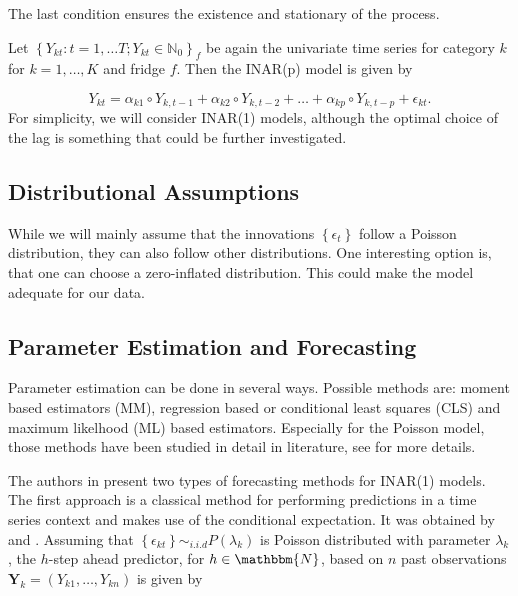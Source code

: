 The last condition ensures the existence and stationary of the process. 

Let $\left\{Y_{kt}:t=1,\ldots T; Y_{kt} \in \mathbb{N}_0\right\}_f$ be again the univariate time series for category $k$ for $k=1,\ldots,K$ and fridge $f$. Then the INAR(p) model is given by

\begin{equation}
Y_{kt} = \alpha_{k1} \circ Y_{k,t-1} + \alpha_{k2} \circ Y_{k,t-2} + \ldots + \alpha_{kp} \circ Y_{k,t-p} +\epsilon_{kt}.
\label{eq:Inar(p) model ts}
\end{equation}
%
For simplicity, we will consider INAR(1) models, although the optimal choice of the lag is something that could be further investigated. 

\subsection{Distributional Assumptions}
\label{sec: Inar Distributional assumptions}

While we will mainly assume that the innovations $\left\{\epsilon_t\right\}$ follow a Poisson distribution, they can also follow other distributions. One interesting option is, that one can choose a zero-inflated distribution. This could make the model adequate for our data. 


\subsection{Parameter Estimation and Forecasting}
\label{sec: Inar Parameter Estimation and Forecasting}

Parameter estimation can be done in several ways. Possible methods are: moment based estimators (MM), regression based or conditional least squares (CLS) and maximum likelhood (ML) based estimators. Especially for the Poisson model, those methods have been studied in detail in literature, see \textcite{Silva:2005} for more details. 

The authors in \textcite{Silva:2005} present two types of forecasting methods for INAR(1) models. The first approach is a classical method for performing predictions in a time series context and makes use of the conditional expectation. It was obtained by \textcite{Bre:1993} and \textcite{Freeland:2004}. Assuming that $\left\{\epsilon_{kt}\right\} \sim_{i.i.d} P(\lambda_k)$ is Poisson distributed with parameter $\lambda_k$, the $h$-step ahead predictor, for $h\in \mathbbm{N}$, based on $n$ past observations $\bm{Y}_k=(Y_{k1},\ldots,Y_{kn})$ is given by

